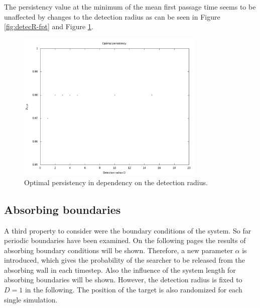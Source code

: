 \documentclass[]{scrartcl}
\begin{document}
The persistency value at the minimum of the mean first passage time seems to be unaffected by changes to the detection radius as can be seen in Figure \ref{fig:detecR-fpt} and Figure \ref{fig:detecR-opt_p}.

\begin{figure}[!hbt]
 \centering
 \includegraphics[width=0.8\textwidth]{./fig/detecR/p_opt.png}
 \caption{Optimal persistency in dependency on the detection radius.}
 \label{fig:detecR-opt_p}
\end{figure}


\subsection{Absorbing boundaries}
\label{ssec:alpha}

A third property to consider were the boundary conditions of the system. So far periodic boundaries have been examined. On the following pages the results of absorbing boundary conditions will be shown. Therefore, a new parameter $\alpha$ is introduced, which gives the probability of the searcher to be released from the absorbing wall in each timestep. Also the influence of the system length for absorbing boundaries will be shown. However, the detection radius is fixed to $D = 1$ in the following. The position of the target is also randomized for each single simulation.
\end{document}
